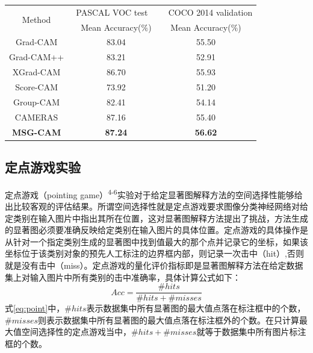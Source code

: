 \begin{table}
	\renewcommand{\arraystretch}{1.5}
	\centering
	\wuhao

	\begin{tabular}{ccccccc} %
		\toprule[1.5pt] %
		\multicolumn{2}{c}{\multirow{2}{*}{Method}}& \multicolumn{2}{c}{PASCAL VOC test}&&\multicolumn{2}{c}{COCO 2014 validation}\\
		\multicolumn{2}{c}{}&&Mean Accuracy($\%$)&&Mean Accuracy($\%$)&\\  %
		\hline %
		\multicolumn{2}{c}{Grad-CAM}&   &83.04&    &55.50&    \\   %
		\multicolumn{2}{c}{Grad-CAM++}&   &83.21&    &52.91&   \\
		\multicolumn{2}{c}{XGrad-CAM}&   &86.70&    &55.93&   \\
		\multicolumn{2}{c}{Score-CAM}&   &73.92&   &51.20&   \\
		\multicolumn{2}{c}{Group-CAM}&   &82.41&  &54.14&   \\
		\multicolumn{2}{c}{CAMERAS}&   &87.16&    &55.40&   \\
		\multicolumn{2}{c}{\textbf{MSG-CAM}}&   &\textbf{87.24}&   &\textbf{56.62}&   \\
		\bottomrule[1.5pt] %
	\end{tabular}

	\label{point}
\end{table}




\subsection{定点游戏实验}
定点游戏（pointing game）\textsuperscript{\cite{zhang2018top}4-6}实验对于给定显著图解释方法的空间选择性能够给出比较客观的评估结果。所谓空间选择性就是定点游戏要求图像分类神经网络对给定类别在输入图片中指出其所在位置，这对显著图解释方法提出了挑战，方法生成的显著图必须要准确反映给定类别在输入图片的具体位置。定点游戏的具体操作是从针对一个指定类别生成的显著图中找到值最大的那个点并记录它的坐标，如果该坐标位于该类别对象的预先人工标注的边界框内部，则记录一次击中（hit）,否则就是没有击中（miss）。定点游戏的量化评价指标即是显著图解释方法在给定数据集上对输入图片中所有类别的击中准确率，具体计算公式如下：
\begin{equation}
	Acc=\frac{\#hits}{\#hits+\#misses}
\label{eq:point}
\end{equation}
式\ref{eq:point}中，$\#hits$表示数据集中所有显著图的最大值点落在标注框中的个数，$\#misses$则表示数据集中所有显著图的最大值点落在标注框外的个数。在只计算最大值空间选择性的定点游戏当中，$\#hits+\#misses$就等于数据集中所有图片标注框的个数。

